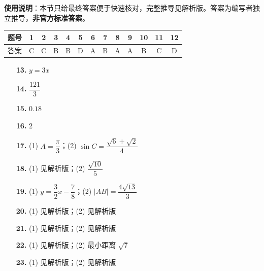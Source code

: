 
\begin{gknotice}
\textbf{使用说明}：本节只给最终答案便于快速核对，完整推导见解析版。答案为编写者独立推导，\textbf{非官方标准答案}。
\end{gknotice}

\begin{center}\begin{tabular}{ccccccccccccc}
\toprule
题号 & 1 & 2 & 3 & 4 & 5 & 6 & 7 & 8 & 9 & 10 & 11 & 12 \\
\midrule
答案 & C & C & B & B & D & A & B & A & A & B & C & D \\
\bottomrule
\end{tabular}\end{center}

\begin{itemize}[leftmargin=2.6em]
  \item[\textbf{13.}] $y=3x$
  \item[\textbf{14.}] $\dfrac{121}3$
  \item[\textbf{15.}] $0.18$
  \item[\textbf{16.}] $2$
\end{itemize}

\begin{itemize}[leftmargin=2.6em]
  \item[\textbf{17.}] (1) $A=\dfrac\pi3$；(2) $\sin C=\dfrac{\sqrt6+\sqrt2}4$
  \item[\textbf{18.}] (1) 见解析版；(2) $\dfrac{\sqrt{10}}5$
  \item[\textbf{19.}] (1) $y=\dfrac32x-\dfrac78$；(2) $|AB|=\dfrac{4\sqrt{13}}3$
  \item[\textbf{20.}] (1) 见解析版；(2) 见解析版
  \item[\textbf{21.}] (1) 见解析版；(2) 见解析版
\end{itemize}

\begin{itemize}[leftmargin=2.6em]
  \item[\textbf{22.}] (1) 见解析版；(2) 最小距离 $\sqrt7$
  \item[\textbf{23.}] (1) 见解析版；(2) 见解析版
\end{itemize}
